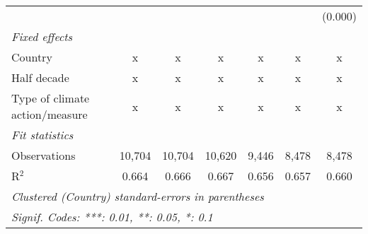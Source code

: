 \begin{tabular}{lcccccc}
                                                     &         &                &                &                &                & (0.000)\\   
   \emph{Fixed effects}\\
   Country                                           & x       & x              & x              & x              & x              & x\\  
   Half decade                                       & x       & x              & x              & x              & x              & x\\  
   Type of climate action/measure                    & x       & x              & x              & x              & x              & x\\  
   \midrule \emph{Fit statistics}\\
   Observations                                      & 10,704  & 10,704         & 10,620         & 9,446          & 8,478          & 8,478\\  
   R$^2$                                             & 0.664   & 0.666          & 0.667          & 0.656          & 0.657          & 0.660\\  
   \midrule
   \multicolumn{7}{l}{\emph{Clustered (Country) standard-errors in parentheses}}\\
   \multicolumn{7}{l}{\emph{Signif. Codes: ***: 0.01, **: 0.05, *: 0.1}}\\
\end{tabular}
\par\endgroup


